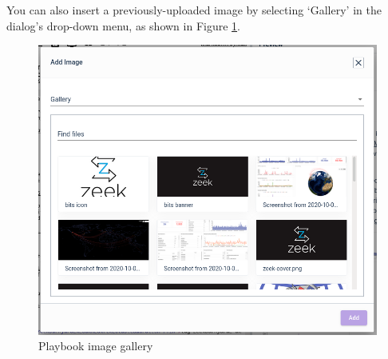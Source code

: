 You can also insert a previously-uploaded image by selecting `Gallery' in the dialog's drop-down menu, as shown in Figure \ref{fig:playbook-gallery}.

\begin{figure}[H]
	\includegraphics[width=0.6\linewidth]{images/playbook-gallery.png}
	\caption{Playbook image gallery}
	\label{fig:playbook-gallery}
\end{figure}
